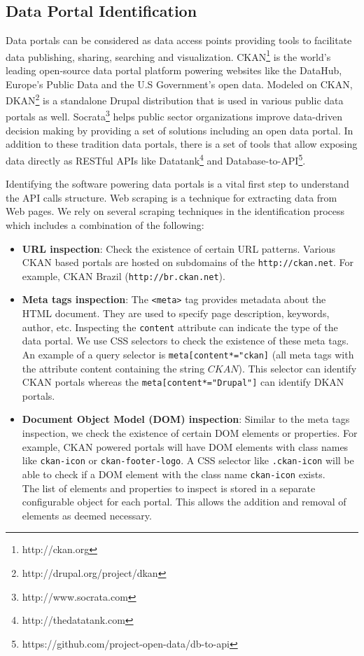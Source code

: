 \documentclass{sig-alternate}
\begin{document}
\subsection{Data Portal Identification}

Data portals can be considered as data access points providing tools to facilitate data publishing, sharing, searching and visualization. CKAN\footnote{http://ckan.org} is the world's leading open-source data portal platform powering websites like the DataHub, Europe's Public Data and the U.S Government's open data. Modeled on CKAN, DKAN\footnote{http://drupal.org/project/dkan} is a standalone Drupal distribution that is used in various public data portals as well. Socrata\footnote{http://www.socrata.com} helps public sector organizations improve data-driven decision making by providing a set of solutions including an open data portal. In addition to these tradition data portals, there is a set of tools that allow exposing data directly as RESTful APIs like Datatank\footnote{http://thedatatank.com} and Database-to-API\footnote{https://github.com/project-open-data/db-to-api}.

Identifying the software powering data portals is a vital first step to understand the API calls structure. Web scraping is a technique for extracting data from Web pages. We rely on several scraping techniques in the identification process which includes a combination of the following:

\begin{itemize}
  \item \textbf{URL inspection}: Check the existence of certain URL patterns. Various CKAN based portals are hosted on subdomains of the \texttt{http://ckan.net}. For example, CKAN Brazil (\texttt{http://br.ckan.net}).
  \item \textbf{Meta tags inspection}: The \texttt{<meta>} tag provides metadata about the HTML document. They are used to specify page description, keywords, author, etc. Inspecting the \texttt{content} attribute can indicate the type of the data portal. We use CSS selectors to check the existence of these meta tags. An example of a query selector is \texttt{meta[content*="ckan]} (all meta tags with the attribute content containing the string $CKAN$). This selector can identify CKAN portals whereas the \texttt{meta[content*="Drupal"]} can identify DKAN portals.
  \item \textbf{Document Object Model (DOM) inspection}: Similar to the meta tags inspection, we check the existence of certain DOM elements or properties. For example, CKAN powered portals will have DOM elements with class names like \texttt{ckan-icon} or \texttt{ckan-footer-logo}. A CSS selector like \texttt{.ckan-icon} will be able to check if a DOM element with the class name \texttt{ckan-icon} exists.\\
  The list of elements and properties to inspect is stored in a separate configurable object for each portal. This allows the addition and removal of elements as deemed necessary.
\end{itemize}
\end{document}
